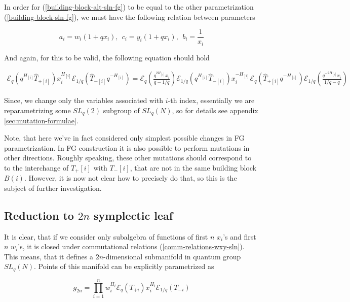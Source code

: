 \documentclass{article}
\newcommand{\lb}{\left (}
\newcommand{\rb}{\right )}
\newcommand{\B}[1]{\lb #1 \rb}
\newcommand{\lsb}{\left [}
\newcommand{\rsb}{\right ]}
\newcommand{\SB}[1]{\lsb #1 \rsb}
\newcommand {\?}{\textit{???}}
\newcommand{\me}[0]{\mathcal{E}}
\newcommand{\hT}[0]{\hat{T}}
\newcommand{\Tp}[1][]{T_{+ #1}}
\newcommand{\Tm}[1][]{T_{- #1}}
\newcommand{\delabel}[1]{(\ref{#1})}
\begin{document}
In order for \delabel{building-block-alt-sln-fg} to be equal to the other parametrization
 \delabel{building-block-sln-fg}, we must have the following relation between parameters

\begin{equation}
a_i = w_i (1 + q x_i),\ \ c_i = y_i ( 1 + q x_i), \ \ b_i = \frac{1}{x_i}
\end{equation}

And again, for this to be valid, the following equation should hold

\begin{align}
\label{mutation-sl2-main-equation}
\me_q(q^{H_{\SB{i}}} \hT_{+ \SB{i}})
x_i^{H_{\SB{i}}}
\me_{1/q}(\hT_{- \SB{i}} q^{-H_{\SB{i}}})
= \me_q\lb \frac{q^{2H_{\SB{i}}} x_i}{q - 1/q}\rb \me_{1/q}(q^{H_{\SB{i}}} \hT_{-\SB{i}})
x_i^{-H_{\SB{i}}}
\me_{q}(\hT_{+ \SB{i}} q^{-H_{\SB{i}}}) \me_{1/q}\lb \frac{q^{-2H_{\SB{i}}} x_i}{1/q - q}\rb
\end{align}

Since, we change only the variables associated with $i$-th index,
 essentially we are reparametrizing some $SL_q(2)$ subgroup of $SL_q(N)$,
so for details see appendix \ref{sec:mutation-formulae}.


Note, that here we've in fact considered only simplest possible changes
in FG parametrization. In FG construction it is also possible to perform mutations
in other directions. Roughly speaking, these other mutations should correspond to
to the interchange of $\Tp{\SB{i}}$ with $\Tm{\SB{i}}$, that are not in the same building block $B(i)$.
 However, it is now not clear how to precisely do that, so this is the subject of
further investigation.


\subsection{Reduction to $2n$ symplectic leaf}

It is clear, that if we consider only subalgebra of functions of first $n$ $x_i$'s and first $n$ $w_i$'s,
it is closed under commutational relations \delabel{comm-relations-wxy-sln}. This means,
that it defines a $2n$-dimensional submanifold in quantum group $SL_q(N)$.
Points of this manifold can be explicitly parametrized as

\begin{equation}
g_{2n} = \prod_{i = 1}^n w_i^{H_{i}} \me_q \B{\Tp[i]} x_i^{H_{i}} \me_{1/q} \B{\Tm[i]}
\end{equation}
\end{document}
